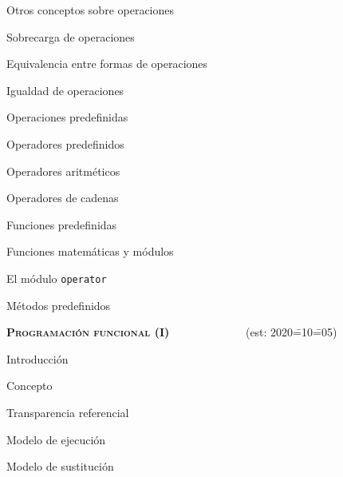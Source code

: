 \begin{longenum}
\begin{longenum}
        \item Otros conceptos sobre operaciones
        \begin{longenum}
            \item Sobrecarga de operaciones
            \item Equivalencia entre formas de operaciones
            \item Igualdad de operaciones
        \end{longenum}
        \item Operaciones predefinidas
        \begin{longenum}
            \item Operadores predefinidos
            \begin{longenum}
                \item Operadores aritméticos
                \item Operadores de cadenas
            \end{longenum}
            \item Funciones predefinidas
            \begin{longenum}
                \item Funciones matemáticas y módulos
                \begin{longenum}
                    \item El módulo \texttt{operator}
                \end{longenum}
            \end{longenum}
            \item Métodos predefinidos
        \end{longenum}
    \end{longenum}
    \item \textbf{\textsc{Programación funcional (I)}} \ \ \ \ \ \ \ \ \ \ \ \ \ (est: 2020\==10\==05)
    \begin{longenum}
        \item Introducción
        \begin{longenum}
            \item Concepto
            \item Transparencia referencial
            \item Modelo de ejecución
            \begin{longenum}
                \item Modelo de sustitución
            \end{longenum}

\end{longenum}
\end{longenum}
\end{longenum}
